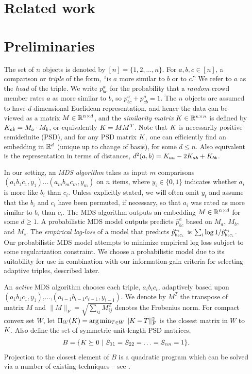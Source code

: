 \documentclass{article}
\begin{document}
\section{Related work}


\section{Preliminaries}\label{sec:prelim}

The set of $n$ objects is denoted by $[n]=\{1,2,\ldots,n\}$.  For $a,b,c \in [n]$, a comparison or {\em triple} of the form, ``is $a$ more similar to $b$ or to $c$.'' We refer to $a$ as the {\em head} of the triple.  We write $p^a_{bc}$ for the probability that a {\em random} crowd member rates $a$ as more similar to $b$, so $p^a_{bc}+p^a_{cb}=1$.
The $n$ objects are assumed to have $d$-dimensional Euclidean representation, and hence the data can be viewed as a matrix $M \in \reals^{n \times d}$, and the {\em similarity matrix} $\S \in \reals^{n \times n}$ is defined by $\S_{ab}=M_a\cdot M_b$, or equivalently $\S = MM^T$.  Note that $\S$ is necessarily positive semidefinite (PSD), and for any PSD matrix $\S$, one can efficiently find an embedding in $\reals^d$ (unique up to change of basis), for some $d \leq n$.  Also equivalent is the representation in terms of distances, $d^2(a,b)=\S_{aa}-2\S_{ab}+\S_{bb}$.

In our setting, an {\em MDS algorithm} takes as input $m$ comparisons $(a_1b_1c_1,y_1) \ldots (a_mb_mc_m,y_m)$ on $n$ items, where $y_i\in \{0,1\}$ indicates whether $a_i$ is more like $b_i$ than $c_i$.  Unless explicitly stated, we will often omit $y_i$ and assume that the $b_i$ and $c_i$ have been permuted, if necessary, so that $a_i$ was rated as more similar to $b_i$ than $c_i$.  The MDS algorithm outputs an embedding $M \in \reals^{n \times d}$ for some $d \geq 1.$  A probabilistic MDS model outputs predicts $\hat{p}^{a}_{bc}$ based on $M_a$, $M_b$, and $M_c$.  The {\em empirical log-loss} of a model that predicts $\hp^{a_i}_{b_ic_i}$ is $\sum_i \log 1/\hp^{a_i}_{b_ic_i}$.
Our probabilistic MDS model attempts to minimize empirical log loss subject to some regularization constraint.  We choose a probabilistic model due to its suitability for use in combination with our information-gain criteria for selecting adaptive triples, described later.

An {\em active} MDS algorithm chooses each triple, $a_ib_ic_i$, adaptively based upon $(a_1b_1c_1,y_1)$,$\ldots$,$(a_{i-1}b_{i-1}c_{i-1},y_{i-1})$.
We denote by $M^T$ the transpose of matrix $M$ and $\|M\|_F=\sqrt{\sum_{ij} M_{ij}^2}$ denotes the Frobenius norm.
For compact convex set $W$, let $\Pi_W(\S)=\arg\min_{T \in W} \|\S-T\|_F^2$ is the closest matrix in $W$ to $\S$.  Also define the set of symmetric  unit-length PSD matrices,
$$B=\{ \S \succeq 0 ~|~ S_{11}=S_{22}=\ldots=S_{nn}=1\}.$$
Projection to the closest element of $B$ is a quadratic program which can be solved via a number of existing techniques -- see \cite{SS05,LRSST10}.
\end{document}
